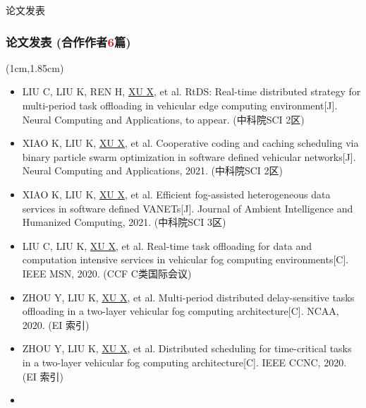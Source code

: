\begin{frame}{论文发表}
\newBackground
\frametitle{论文发表 (合作作者\hspace{0.5em}\textcolor{red}{6}\hspace{0.5em}篇)}
\begin{center}
\begin{textblock*}{\textwidth}(1cm,1.85cm)
	\begin{footnotesize}
		\begin{itemize}
			\item[1] \englishfont LIU C, LIU K, REN H, \underline{\textcolor{cqublue}{XU X}}, et al. RtDS: Real-time distributed strategy for multi-period task offloading in vehicular edge computing environment[J]. \textcolor{cqublue}{Neural Computing and Applications}, to appear. (中科院SCI 2区)
			\item[2] XIAO K, LIU K, \underline{\textcolor{cqublue}{XU X}}, et al. Cooperative coding and caching scheduling via binary particle swarm optimization in software defined vehicular networks[J]. \textcolor{cqublue}{Neural Computing and Applications}, 2021. (中科院SCI 2区)
			\item[3] XIAO K, LIU K, \underline{\textcolor{cqublue}{XU X}}, et al. Efficient fog-assisted heterogeneous data services in software defined VANETs[J]. \textcolor{cqublue}{Journal of Ambient Intelligence and Humanized Computing}, 2021. (中科院SCI 3区)
			\item[4] LIU C, LIU K, \underline{\textcolor{cqublue}{XU X}}, et al. Real-time task offloading for data and computation intensive services in vehicular fog computing environments[C]. \textcolor{cqublue}{IEEE MSN}, 2020. (CCF C类国际会议)
			\item[5] ZHOU Y, LIU K, \underline{\textcolor{cqublue}{XU X}}, et al. Multi-period distributed delay-sensitive tasks offloading in a two-layer vehicular fog computing architecture[C]. \textcolor{cqublue}{NCAA}, 2020. (EI 索引)
			\item[6] ZHOU Y, LIU K, \underline{\textcolor{cqublue}{XU X}}, et al. Distributed scheduling for time-critical tasks in a two-layer vehicular fog computing architecture[C]. \textcolor{cqublue}{IEEE CCNC}, 2020. (EI 索引)
			\item %
		\end{itemize}	
	\end{footnotesize}
\end{textblock*}
\end{center}
\end{frame}

